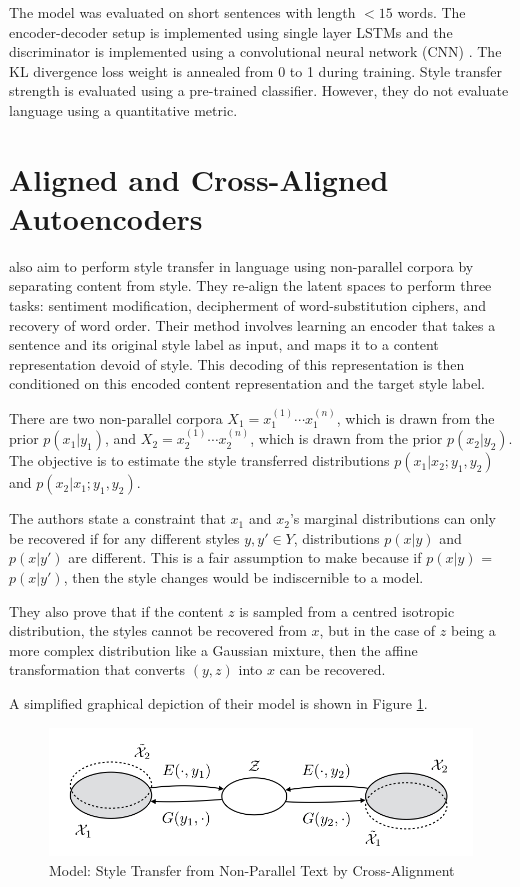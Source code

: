 The model was evaluated on short sentences with length $<15$ words. The encoder-decoder setup is implemented using single layer LSTMs and the discriminator is implemented using a convolutional neural network (CNN) \citep{hu2016harnessing}. The KL divergence loss weight is annealed from 0 to 1 during training. Style transfer strength is evaluated using a pre-trained classifier. However, they do not evaluate language using a quantitative metric.


\section{Aligned and Cross-Aligned Autoencoders}

\cite{shen2017style} also aim to perform style transfer in language using non-parallel corpora by separating content from style. They re-align the latent spaces to perform three tasks: sentiment modification, decipherment of word-substitution ciphers, and recovery of word order. Their method involves learning an encoder that takes a sentence and its original style label as input, and maps it to a content representation devoid of style. This decoding of this representation is then conditioned on this encoded content representation and the target style label.

There are two non-parallel corpora $X_1 = {x_1^{(1)} \cdots x_1^{(n)}}$, which is drawn from the prior $p(x_1|y_1)$, and $X_2 = {x_2^{(1)} \cdots x_2^{(n)}}$, which is drawn from the prior $p(x_2|y_2)$. The objective is to estimate the style transferred distributions $p(x_1|x_2;y_1,y_2)$ and $p(x_2|x_1;y_1,y_2)$.

The authors state a constraint that $x_1$ and $x_2$'s marginal distributions can only be recovered if for any different styles $y, y' \in Y$, distributions $p(x|y)$ and $p(x|y')$ are different. This is a fair assumption to make because if $p(x|y)$ = $p(x|y')$, then the style changes would be indiscernible to a model.

They also prove that if the content $z$ is sampled from a centred isotropic distribution, the styles cannot be recovered from $x$, but in the case of $z$ being a more complex distribution like a Gaussian mixture, then the affine transformation that converts $(y, z)$ into $x$ can be recovered.

A simplified graphical depiction of their model is shown in Figure \ref{fig:stca-architecture}.

\begin{figure}[ht]
	\centering
	\includegraphics[width=\textwidth]{images/stca-architecture}
	\caption{\label{fig:stca-architecture} Model: Style Transfer from Non-Parallel Text by Cross-Alignment}
\end{figure}

